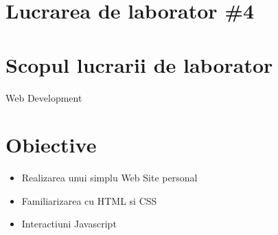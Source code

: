 \section*{Lucrarea de laborator \#4}

\section{Scopul lucrarii de laborator}
Web Development\\
\section{Obiective}
\begin{itemize}
\item Realizarea unui simplu Web Site personal
\item Familiarizarea cu HTML si CSS
\item Interactiuni Javascript
\end{itemize}
\clearpage